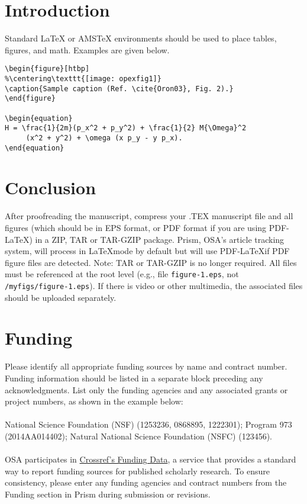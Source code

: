 \documentclass[10pt]{article}
\begin{document}
\section{Introduction}

Standard \LaTeX{} or AMS\TeX{} environments should be used to place tables, figures, and math. Examples are given below.

\begin{verbatim}
\begin{figure}[htbp]
%\centering\texttt{[image: opexfig1]}
\caption{Sample caption (Ref. \cite{Oron03}, Fig. 2).}
\end{figure}

\begin{equation}
H = \frac{1}{2m}(p_x^2 + p_y^2) + \frac{1}{2} M{\Omega}^2
     (x^2 + y^2) + \omega (x p_y - y p_x).
\end{equation}
\end{verbatim}

\section{Conclusion}
After proofreading the manuscript, compress your .TEX manuscript file and all figures (which should be in EPS format, or PDF format if you are using PDF-\LaTeX) in a ZIP, TAR or TAR-GZIP package. Prism, OSA's article tracking system, will process in \LaTeX mode by default but will use PDF-\LaTeX if PDF figure files are detected. Note: TAR or TAR-GZIP is no longer required. All files must be referenced at the root level (e.g., file \texttt{figure-1.eps}, not \texttt{/myfigs/figure-1.eps}). If there is video or other multimedia, the associated files should be uploaded separately.

\section*{Funding}
Please identify all appropriate funding sources by name and contract number. Funding information should be listed in a separate block preceding any acknowledgments. List only the funding agencies and any associated grants or project numbers, as shown in the example below:\\
\\
National Science Foundation (NSF) (1253236, 0868895, 1222301); Program 973 (2014AA014402); Natural National Science Foundation (NSFC) (123456).\\
\\
OSA participates in \href{http://www.crossref.org/fundingdata/}{Crossref's Funding Data}, a service that provides a standard way to report funding sources for published scholarly research. To ensure consistency, please enter any funding agencies and contract numbers from the Funding section in Prism during submission or revisions.
\end{document}

